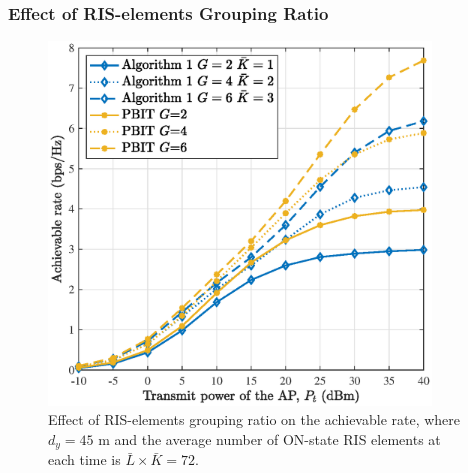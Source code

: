 \documentclass[draftclsnofoot,onecolumn,12pt]{IEEEtran}
\newcommand{\revh}[1]{{\color{black}#1}} %
\newcommand{\revh}[1]{#1}
\begin{document}
\subsubsection{Effect of RIS-elements Grouping Ratio}



\begin{figure}[!t]
	\centering
	\includegraphics[width=4in]{grouping1.eps}
	\revh{\caption{Effect of RIS-elements grouping ratio on the achievable rate, where $d_y=45$ m and the average number of ON-state RIS elements at each time is $\bar{L}\times\bar{K}=72$.}}
	\label{grouping}
\end{figure}
\end{document}
